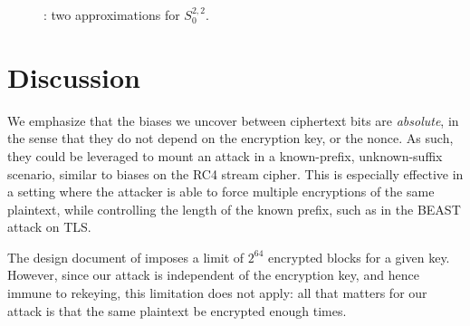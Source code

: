 \documentclass{llncs}
\begin{document}
\begin{figure}
  \caption{: two approximations for $S^{2,2}_0$.}
  \label{fig:twoapproximations}
\end{figure}

\section{Discussion}


We emphasize that the biases we uncover between ciphertext bits are \emph{absolute}, in the sense that they do not depend on the encryption key, or the nonce. As such, they could be leveraged to mount an attack in a known-prefix, unknown-suffix scenario, similar to biases on the RC4 stream cipher. This is especially effective in a setting where the attacker is able to force multiple encryptions of the same plaintext, while controlling the length of the known prefix, such as in the BEAST attack on TLS.

The design document of  imposes a limit of $2^{64}$ encrypted blocks for a given key. However, since our attack is independent of the encryption key, and hence immune to rekeying, this limitation does not apply: all that matters for our attack is that the same plaintext be encrypted enough times.
\end{document}
